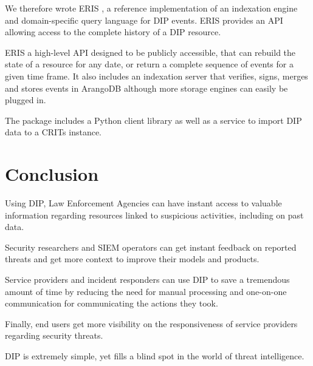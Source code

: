 \documentclass[conference]{IEEEtran}
\begin{document}
We therefore wrote ERIS \cite{ERIS}, a reference implementation of an indexation engine and domain-specific query language for DIP events. ERIS provides an API allowing access to the complete history of a DIP resource.

ERIS a high-level API designed to be publicly accessible, that can rebuild the state of a resource for any date, or return a complete sequence of events for a given time frame. It also includes an indexation server that verifies, signs, merges and stores events in ArangoDB \cite{arangodb} although more storage engines can easily be plugged in.

The package includes a Python client library as well as a service to import DIP data to a CRITs \cite{CRITs} instance.

\section{Conclusion}

Using DIP, Law Enforcement Agencies can have instant access to valuable information regarding resources linked to suspicious activities, including on past data.

Security researchers and SIEM operators can get instant feedback on reported threats and get more context to improve their models and products.

Service providers and incident responders can use DIP to save a tremendous amount of time by reducing the need for manual processing and one-on-one communication for communicating the actions they took.

Finally, end users get more visibility on the responsiveness of service providers regarding security threats.

DIP is extremely simple, yet fills a blind spot in the world of threat intelligence.

\end{document}
